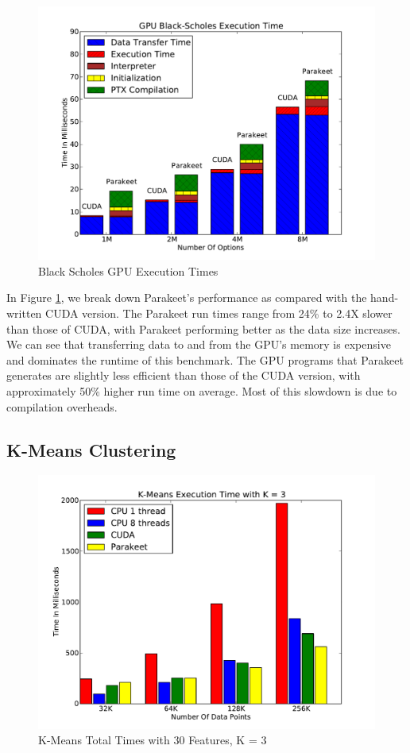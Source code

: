 \documentclass[10pt,twocolumn]{article}
\begin{document}
\begin{figure}[h!]
\includegraphics[scale=0.4]{BSNOCPU.pdf}
\caption{Black Scholes GPU Execution Times}
\label{BSGPU}
\end{figure}

In Figure \ref{BSGPU}, we break down Parakeet's performance as compared with the hand-written CUDA version.  The Parakeet run times range from 24\% to 2.4X slower than those of CUDA, with Parakeet performing better as the data size increases.  We can see that transferring data to and from the GPU's memory is expensive and dominates the runtime of this benchmark.  The GPU programs that Parakeet generates are slightly less efficient than those of the CUDA version, with approximately 50\% higher run time on average.  Most of this slowdown is due to compilation overheads.

\subsection{K-Means Clustering}
\label{results-k-means}

\begin{figure}
\includegraphics[scale=0.4]{KMCPUK3.pdf}
\caption{K-Means Total Times with 30 Features, K = 3}
\label{KMCPU3}
\end{figure}
\end{document}
